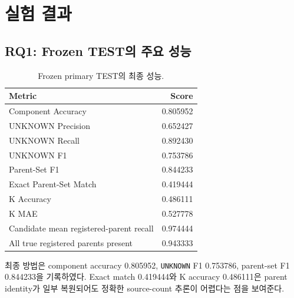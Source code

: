 \documentclass[runningheads]{llncs}
\begin{document}
\section{실험 결과}

\subsection{RQ1: Frozen TEST의 주요 성능}
\begin{table}[!htbp]
\centering
\caption{Frozen primary TEST의 최종 성능.}
\label{tab:mainresult}
\scriptsize
\begin{tabular}{lr}
\toprule
Metric & Score\\
\midrule
Component Accuracy & 0.805952\\
UNKNOWN Precision & 0.652427\\
UNKNOWN Recall & 0.892430\\
UNKNOWN F1 & 0.753786\\
Parent-Set F1 & 0.844233\\
Exact Parent-Set Match & 0.419444\\
K Accuracy & 0.486111\\
K MAE & 0.527778\\
Candidate mean registered-parent recall & 0.974444\\
All true registered parents present & 0.943333\\
\bottomrule
\end{tabular}
\end{table}
최종 방법은 component accuracy 0.805952, \texttt{UNKNOWN} F1 0.753786, parent-set F1 0.844233을 기록하였다. Exact match 0.419444와 K accuracy 0.486111은 parent identity가 일부 복원되어도 정확한 source-count 추론이 어렵다는 점을 보여준다.
\end{document}
